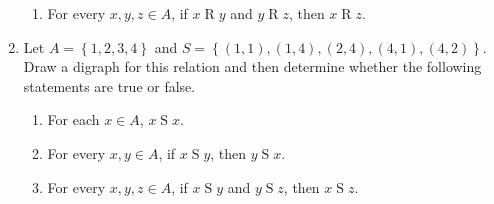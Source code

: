 \begin{previewactivity}
\begin{enumerate}
\begin{enumerate}
  \item For every  $x, y, z \in A$, if  $x \mathrel{R} y$ and  $y \mathrel{R} z$, then  
                   $x \mathrel{R} z$.
\end{enumerate}

\item Let  $A = \left\{ {1, 2, 3, 4} \right\}$ and  
$S = \left\{ {( {1, 1} ), ( {1, 4} ), ( {2, 4} ), ( {4, 1} ), ( {4, 2} )} \right\}$.  Draw a digraph for this relation and then determine whether the following statements are true or false.

\begin{enumerate}
  \item For each  $x \in A$,  $x \mathrel{S} x$.

  \item For every  $x, y \in A$, if  $x \mathrel{S} y$, then  $y \mathrel{S} x$.

  \item For every  $x, y, z \in A$, if  $x \mathrel{S} y$ and  $y \mathrel{S} z$, then  
                   $x \mathrel{S} z$.
\end{enumerate}
\end{enumerate}
\end{previewactivity}
\hbreak
%
